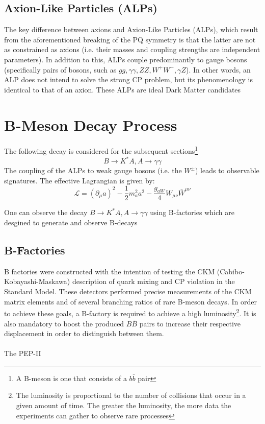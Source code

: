 \documentclass{article}
\begin{document}
\subsection{Axion-Like Particles (ALPs)}
The key difference between axions and Axion-Like Particles (ALPs), which result from the aforementioned breaking of the PQ symmetry is that the latter are not as constrained as axions (i.e. their masses and coupling strengths are independent parameters). 
In addition to this, ALPs couple predominantly to gauge bosons (specifically pairs of bosons, such as $gg, \gamma\gamma, ZZ, W^{+}W^{-}, \gamma Z$). In other words, an ALP does not intend to solve the strong CP problem, but its phenomenology is identical to that of an axion. These ALPs are ideal Dark Matter candidates

\section{B-Meson Decay Process}
The following decay is considered for the subsequent sections\footnote{A B-meson is one that consists of a $b\bar{b}$ pair}
\begin{equation}
    B\rightarrow K^{*}A, A\rightarrow\gamma\gamma
\end{equation}
The coupling of the ALPs to weak gauge bosons (i.e. the $W^{\pm}$) leads to observable signatures. The effective Lagrangian is given by:
\begin{equation}
    \mathcal{L} = (\partial_{\mu}a)^{2}-\frac{1}{2}m_{a}^{2}a^{2}-\frac{g_{aW}}{4}W_{\mu\nu}\bar{W}^{\mu\nu}
\end{equation}


One can observe the decay $B\rightarrow K^{*}A, A\rightarrow\gamma\gamma$ using B-factories which are desgined to generate and observe B-decays

\subsection{B-Factories}
B factories were constructed with the intention of testing the CKM (Cabibo-Kobayashi-Maskawa) description of quark mixing and CP violation in the Standard Model. These detectors performed precise measurements of the CKM matrix elements and of several branching ratios of rare B-meson decays. In order to achieve these goals, a B-factory 
is required to achieve a high luminosity\footnote{The luminosity is proportional to the number of collisions that occur in a given amount of time. The greater the luminosity, the more data the experiments can gather to observe rare processes}. It is also mandatory to boost the produced $B\bar{B}$ pairs to increase their respective displacement 
in order to distinguish between them. \\
\\
The PEP-II 
\end{document}
